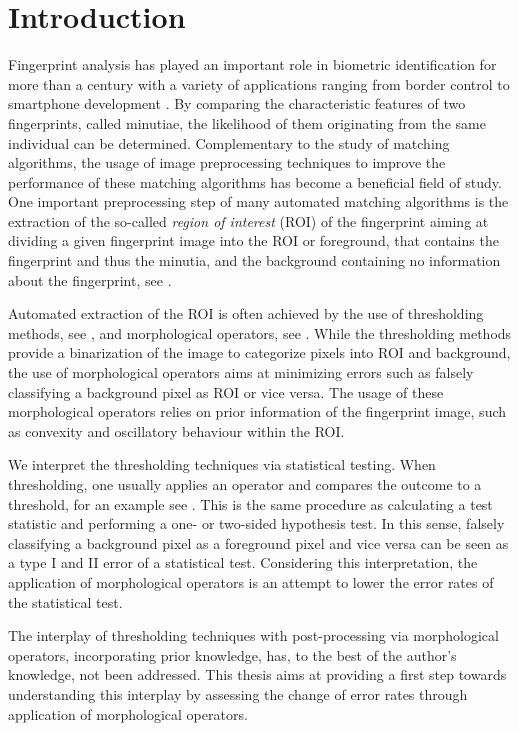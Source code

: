 \documentclass[a4paper,12pt]{article}
\theoremstyle{plain}
\theoremstyle{definition}
\begin{document}
\newpage



\section{Introduction}\label{section: introduction}

Fingerprint analysis has played an important role in biometric identification for more than a century with a variety of applications ranging from border control to smartphone development \cite{Henry}. By comparing the characteristic features of two fingerprints, called minutiae, the likelihood of them originating from the same individual can be determined. Complementary to the study of matching algorithms, the usage of image preprocessing techniques to improve the performance of these matching algorithms has become a beneficial field of study. One important preprocessing step of many automated matching algorithms is the extraction of the so-called \emph{region of interest} (ROI) of the fingerprint aiming at dividing a given fingerprint image into the ROI or foreground, that contains the fingerprint and thus the minutia, and the background containing no information about the fingerprint, see \cite{handbookfipri}.

Automated extraction of the ROI is often achieved by the use of thresholding methods, see \cite{FDB}, and morphological operators, see \cite{FDB, BazenGerez, adaboost}. While the thresholding methods provide a binarization of the image to categorize pixels into ROI and background, the use of morphological operators aims at minimizing errors such as falsely classifying a background pixel as ROI or vice versa. The usage of these morphological operators relies on prior information of the fingerprint image, such as convexity and oscillatory behaviour within the ROI.

We interpret the thresholding techniques via statistical testing. When thresholding, one usually applies an operator and compares the outcome to a threshold, for an example see \cite{AbramovichBenjamini1996}. This is the same procedure as calculating a test statistic and performing a one- or two-sided hypothesis test. In this sense, falsely classifying a background pixel as a foreground pixel and vice versa can be seen as a type I and II error of a statistical test. Considering this interpretation, the application of morphological operators is an attempt to lower the error rates of the statistical test.

The interplay of thresholding techniques with post-processing via morphological operators, incorporating prior knowledge, has, to the best of the author's knowledge, not been addressed. This thesis aims at providing a first step towards understanding this interplay by assessing the change of error rates through application of morphological operators.
\end{document}
